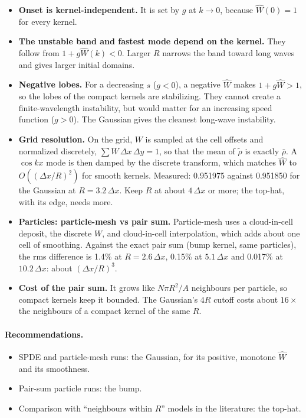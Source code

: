 \documentclass[11pt]{article}
\newcommand{\rt}{\tilde\rho}
\newcommand{\rb}{\bar\rho}
\newcommand{\Wh}{\hat W}
\begin{document}
\begin{itemize}
  \item \textbf{Onset is kernel-independent.} It is set by $g$ at $k\to0$,
        because $\Wh(0)=1$ for every kernel.
  \item \textbf{The unstable band and fastest mode depend on the kernel.}
        They follow from $1+g\Wh(k)<0$. Larger $R$ narrows the band toward
        long waves and gives larger initial domains.
  \item \textbf{Negative lobes.} For a decreasing $s$ ($g<0$), a negative
        $\Wh$ makes $1+g\Wh>1$, so the lobes of the compact kernels are
        stabilizing. They cannot create a finite-wavelength instability, but
        would matter for an increasing speed function ($g>0$). The Gaussian
        gives the cleanest long-wave instability.
  \item \textbf{Grid resolution.} On the grid, $W$ is sampled at the cell
        offsets and normalized discretely, $\sum W\,\Delta x\,\Delta y=1$, so
        that the mean of $\rt$ is exactly $\rb$. A $\cos kx$ mode is then
        damped by the discrete transform, which matches $\Wh$ to
        $O((\Delta x/R)^2)$ for smooth kernels. Measured: 0.951975 against
        0.951850 for the Gaussian at $R=3.2\,\Delta x$. Keep $R$ at about
        $4\,\Delta x$ or more; the top-hat, with its edge, needs more.
  \item \textbf{Particles: particle-mesh vs pair sum.} Particle-mesh uses a
        cloud-in-cell deposit, the discrete $W$, and cloud-in-cell
        interpolation, which adds about one cell of smoothing. Against the
        exact pair sum (bump kernel, same particles), the rms difference is
        1.4\% at $R=2.6\,\Delta x$, 0.15\% at $5.1\,\Delta x$ and 0.017\% at
        $10.2\,\Delta x$: about $(\Delta x/R)^3$.
  \item \textbf{Cost of the pair sum.} It grows like $N\pi R^2/A$ neighbours
        per particle, so compact kernels keep it bounded. The Gaussian's $4R$
        cutoff costs about $16\times$ the neighbours of a compact kernel of the
        same $R$.
\end{itemize}
\paragraph{Recommendations.}
\begin{itemize}
  \item SPDE and particle-mesh runs: the Gaussian, for its positive, monotone
        $\Wh$ and its smoothness.
  \item Pair-sum particle runs: the bump.
  \item Comparison with ``neighbours within $R$'' models in the literature:
        the top-hat.
\end{itemize}
\end{document}
